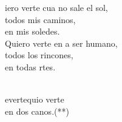 \begin{cancion}%
	iero verte cua no sale el sol,\\
	 todos mis caminos,\\
	en mis soledes.\\
	Quiero verte en a ser humano,\\
	 todos los rincones,\\
	en todas rtes.\\\jump\\
	\begin{chorus}%
	evertequio verte\\
	en dos  canos.(**)\\
	\end{chorus}%
	\jump\\
\end{cancion}%
